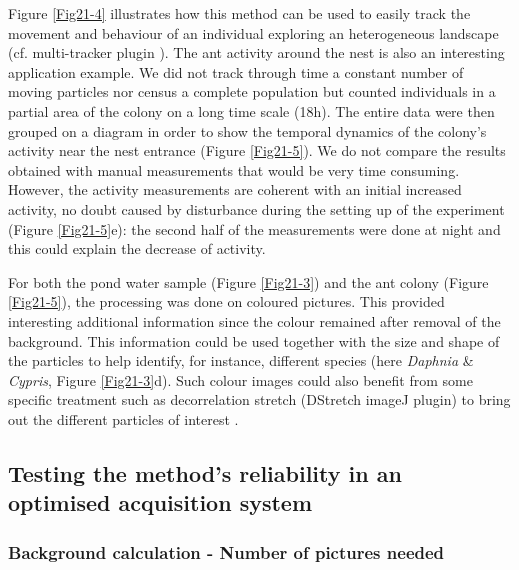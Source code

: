 Figure \ref{Fig21-4} illustrates how this method can be used to easily track the movement
and behaviour of an individual exploring an heterogeneous landscape (cf.
multi-tracker plugin \citealp{kuhn2001a}). The ant activity around the nest is
also an interesting application example. We did not track through time a constant number
of moving particles nor census a complete population but counted individuals in
a partial area of the colony on a long time scale (18h). The entire data were
then grouped on a diagram in order to show the temporal dynamics of the colony’s
activity near the nest entrance (Figure \ref{Fig21-5}). We do not compare the results
obtained with manual measurements that would be very time consuming. However,
the activity measurements are coherent with an initial increased activity, no
doubt caused by disturbance during the setting up of the experiment (Figure \ref{Fig21-5}e):
the second half of the measurements were done at night and this could explain
the decrease of activity.

For both the pond water sample (Figure \ref{Fig21-3}) and the ant colony (Figure \ref{Fig21-5}), the
processing was done on coloured pictures. This provided interesting additional
information since the colour remained after removal of the background. This
information could be used together with the size and shape of the particles to
help identify, for instance, different species (here \textit{Daphnia} \& \textit{Cypris}, Figure
\ref{Fig21-3}d). Such colour images could also benefit from some specific
treatment such as decorrelation stretch (DStretch imageJ plugin) to bring out the different
particles of interest \autocite{harman2011a}.

\subsection{Testing the method’s reliability in an optimised acquisition system}

\subsubsection{Background calculation - Number of pictures needed}

